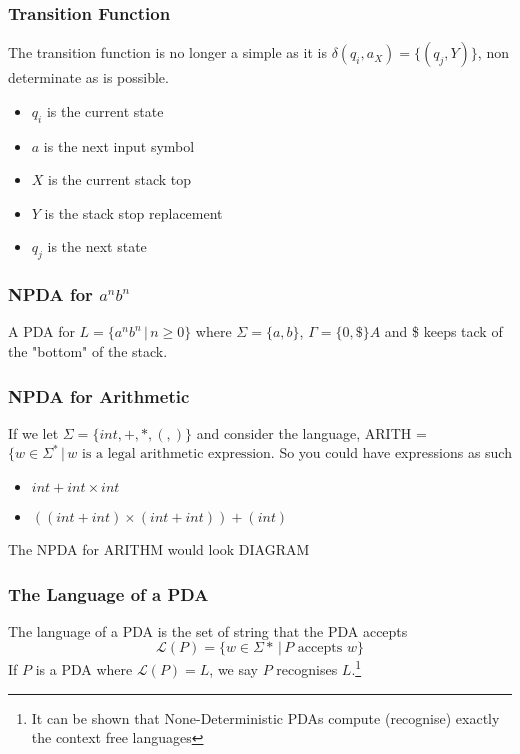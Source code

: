 \subsubsection{Transition Function}
The transition function is no longer a simple as it is $\delta(q_i,a_X) = \{(q_j,Y)\}$, non determinate as {} is possible.
\begin{itemize}
    \item $q_i$ is the current state
    \item $a$ is the next input symbol
    \item $X$ is the current stack top
    \item $Y$ is the stack stop replacement 
    \item $q_j$ is the next state
\end{itemize}
\subsubsection{NPDA for $a^nb^n$}
A PDA for $L = \{a^nb^n\,|\, n\geq0\}$ where $\Sigma = \{a,b\}$, $\Gamma = \{0,\$\}A$ and \$ keeps tack of the "bottom" of the stack.
\subsubsection{NPDA for Arithmetic}
If we let $\Sigma = \{ int,+,*,(,)\}$ and consider the language, ARITH = $\{ w \in \Sigma^*\,|\, w \text{ is a legal arithmetic expression}$. So you could have expressions as such
\begin{itemize}
    \item $int + int \times int$
    \item $((int + int) \times (int + int)) + (int)$
\end{itemize}
The NPDA for ARITHM would look 
DIAGRAM
\subsubsection{The Language of a PDA}
The language of a PDA is the set of string that the PDA accepts
$$
    \mathscr{L}(P)= \{w \in \Sigma* \, |\, P \text{ accepts }w\}
$$
If $P$ is a PDA where $\mathscr{L}(P)=L$, we say $P$ recognises $L$.\footnote{It can be shown that None-Deterministic PDAs compute (recognise) exactly the context free languages}
